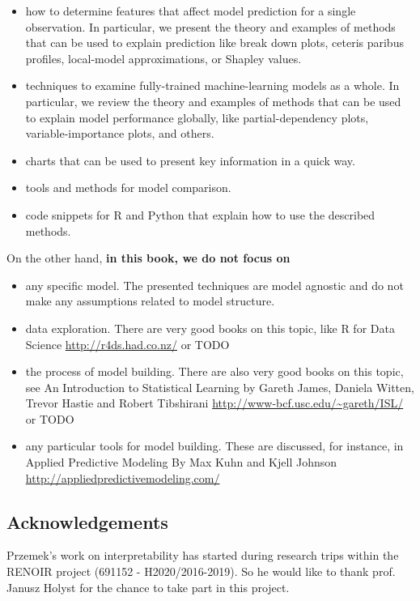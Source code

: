 \documentclass[12pt,]{krantz}
\providecommand{\tightlist}{%
  \setlength{\itemsep}{0pt}\setlength{\parskip}{0pt}}
\theoremstyle{definition}
\theoremstyle{definition}
\theoremstyle{definition}
\theoremstyle{remark}
\begin{document}
\begin{itemize}
\tightlist
\item
  how to determine features that affect model prediction for a single
  observation. In particular, we present the theory and examples of
  methods that can be used to explain prediction like break down plots,
  ceteris paribus profiles, local-model approximations, or Shapley
  values.
\item
  techniques to examine fully-trained machine-learning models as a
  whole. In particular, we review the theory and examples of methods
  that can be used to explain model performance globally, like
  partial-dependency plots, variable-importance plots, and others.
\item
  charts that can be used to present key information in a quick way.
\item
  tools and methods for model comparison.
\item
  code snippets for R and Python that explain how to use the described
  methods.
\end{itemize}

On the other hand, \textbf{in this book, we do not focus on}

\begin{itemize}
\tightlist
\item
  any specific model. The presented techniques are model agnostic and do
  not make any assumptions related to model structure.
\item
  data exploration. There are very good books on this topic, like R for
  Data Science \url{http://r4ds.had.co.nz/} or TODO
\item
  the process of model building. There are also very good books on this
  topic, see An Introduction to Statistical Learning by Gareth James,
  Daniela Witten, Trevor Hastie and Robert Tibshirani
  \url{http://www-bcf.usc.edu/~gareth/ISL/} or TODO
\item
  any particular tools for model building. These are discussed, for
  instance, in Applied Predictive Modeling By Max Kuhn and Kjell Johnson
  \url{http://appliedpredictivemodeling.com/}
\end{itemize}

\hypertarget{thanksto}{%
\subsection{Acknowledgements}\label{thanksto}}

Przemek's work on interpretability has started during research trips
within the RENOIR project (691152 - H2020/2016-2019). So he would like
to thank prof. Janusz Holyst for the chance to take part in this
project.
\end{document}
